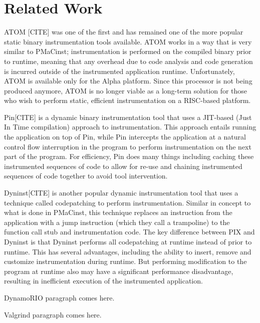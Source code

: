 \section{Related Work}

ATOM [CITE] was one of the first and has remained one of the more popular static binary instrumentation tools
available. ATOM works in a way that is very similar to PMaCinst; instrumentation is performed on the compiled
binary prior to runtime, meaning that any overhead due to code analysis and code generation is incurred outside of
the instrumented application runtime. Unfortunately, ATOM is available only for the Alpha platform. Since this
processor is not being produced anymore, ATOM is no longer viable as a long-term solution for those who wish to
perform static, efficient instrumentation on a RISC-based platform. 

Pin[CITE] is a dynamic binary instrumentation tool that uses a JIT-based (Just In Time compilation) approach to
instrumentation. This approach entails running the application on top of Pin, while Pin intercepts the
application at a natural control flow interruption in the program to perform instrumentation on the next part of the
program. For efficiency, Pin does many things including caching these instrumented sequences of code to allow for
re-use and chaining instrumented sequences of code together to avoid tool intervention.

Dyninst[CITE] is another popular dynamic instrumentation tool that uses a technique called codepatching
to perform instrumentation. Similar in concept to what is done in PMaCinst, this technique replaces an
instruction from the application with a jump instruction (which they call a trampoline) to the function call stub and
instrumentation code. The key difference between PIX and Dyninst is that Dyninst performs all codepatching
at runtime instead of prior to runtime. This has several advantages, including the ability to insert, remove
and customize instrumentation during runtime. But performing modification to the program at runtime also
may have a significant performance disadvantage, resulting in inefficient execution of the instrumented application.

DynamoRIO paragraph comes here.

Valgrind paragraph comes here.